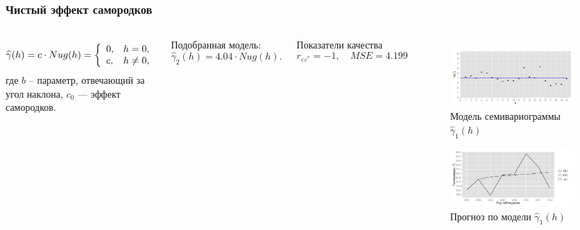 \documentclass[10pt,pdf,aspectratio=169,hyperref={unicode}]{beamer}
\begin{document}
\begin{frame}
  \frametitle{Чистый эффект самородков}
  \begin{columns}[c]
  \column{3in}
  \begin{equation}\begin{gathered}
  \label{eq:nug}
    \widehat{\gamma}(h) = c \cdot Nug(h) = \left\{
   \begin{array}{l l}
     0, & h = 0, \\
     c, & h \neq 0,
   \end{array} \right.
  \end{gathered}\end{equation}
  где $ b $ -- параметр, отвечающий за угол наклона, $ c_0 $ --- эффект самородков.

  \vspace{0.5em}

  Подобранная модель:
  \begin{equation}
  \label{eq:gamma2}
    \widehat{\gamma}_2(h) = 4.04 \cdot Nug(h).
  \end{equation}

  Показатели качества
  \begin{equation*}
    r_{\varepsilon\varepsilon^{*}} = -1, \quad MSE = 4.199
  \end{equation*}

  \column{3in}
  \vspace{-14.5pt}
  \begin{figure}[H]
    \includegraphics[width=0.9\linewidth]{../../figures/variogram/lin-fit-modeled.png} \\
    \caption{Модель семивариограммы $\widehat{\gamma}_1(h)$}
    \includegraphics[width=0.9\linewidth]{../../figures/variogram/lin-fit-cross-prediction.png}
    \caption{Прогноз по модели $\widehat{\gamma}_1(h)$}
  \end{figure}
  \end{columns}
\end{frame}
\end{document}
